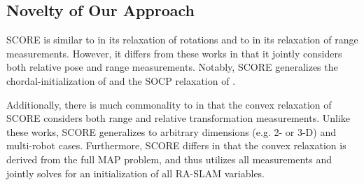 \subsection{Novelty of Our Approach}

SCORE is similar to \cite{martinec07cvpr} in its relaxation of rotations and to
\cite{naddafzadeh-shirazi14twc} in its relaxation of range measurements.
However, it differs from these works in that it jointly considers both relative
pose and range measurements. Notably, SCORE generalizes the
chordal-initialization of \cite{martinec07cvpr} and the SOCP relaxation of
\cite{naddafzadeh-shirazi14twc}.

Additionally, there is much commonality to
\cite{jiang20itaes,li20iros,Li2022ral} in that the convex relaxation of SCORE
considers both range and relative transformation measurements. Unlike these
works, SCORE generalizes to arbitrary dimensions (e.g. 2- or 3-D) and
multi-robot cases. Furthermore, SCORE differs in that the convex relaxation is
derived from the full MAP problem, and thus utilizes all measurements and
jointly solves for an initialization of all RA-SLAM variables.

